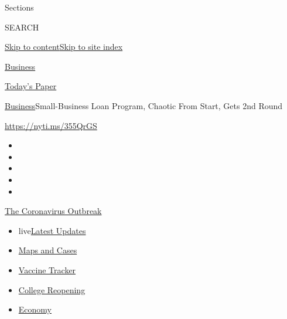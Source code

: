 Sections

SEARCH

\protect\hyperlink{site-content}{Skip to
content}\protect\hyperlink{site-index}{Skip to site index}

\href{https://www.nytimes3xbfgragh.onion/section/business}{Business}

\href{https://myaccount.nytimes3xbfgragh.onion/auth/login?response_type=cookie\&client_id=vi}{}

\href{https://www.nytimes3xbfgragh.onion/section/todayspaper}{Today's
Paper}

\href{/section/business}{Business}\textbar{}Small-Business Loan Program,
Chaotic From Start, Gets 2nd Round

\url{https://nyti.ms/355QrGS}

\begin{itemize}
\item
\item
\item
\item
\item
\end{itemize}

\href{https://www.nytimes3xbfgragh.onion/news-event/coronavirus?action=click\&pgtype=Article\&state=default\&region=TOP_BANNER\&context=storylines_menu}{The
Coronavirus Outbreak}

\begin{itemize}
\tightlist
\item
  live\href{https://www.nytimes3xbfgragh.onion/2020/08/03/world/coronavirus-covid-19.html?action=click\&pgtype=Article\&state=default\&region=TOP_BANNER\&context=storylines_menu}{Latest
  Updates}
\item
  \href{https://www.nytimes3xbfgragh.onion/interactive/2020/us/coronavirus-us-cases.html?action=click\&pgtype=Article\&state=default\&region=TOP_BANNER\&context=storylines_menu}{Maps
  and Cases}
\item
  \href{https://www.nytimes3xbfgragh.onion/interactive/2020/science/coronavirus-vaccine-tracker.html?action=click\&pgtype=Article\&state=default\&region=TOP_BANNER\&context=storylines_menu}{Vaccine
  Tracker}
\item
  \href{https://www.nytimes3xbfgragh.onion/2020/08/02/us/covid-college-reopening.html?action=click\&pgtype=Article\&state=default\&region=TOP_BANNER\&context=storylines_menu}{College
  Reopening}
\item
  \href{https://www.nytimes3xbfgragh.onion/live/2020/08/03/business/stock-market-today-coronavirus?action=click\&pgtype=Article\&state=default\&region=TOP_BANNER\&context=storylines_menu}{Economy}
\end{itemize}

